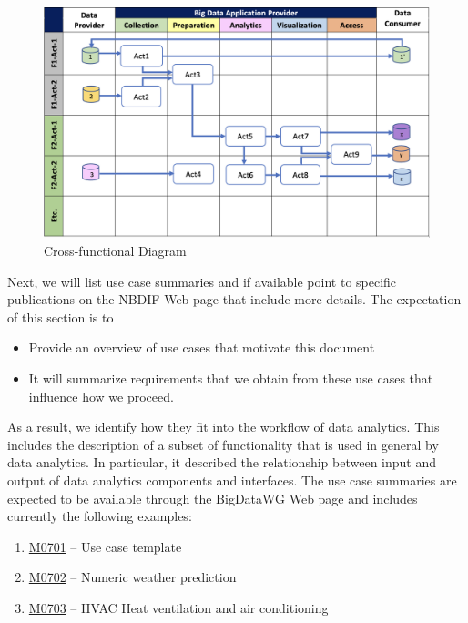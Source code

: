 \begin{figure}[htb]
    \centering
    \includegraphics[width=1.0\columnwidth]{images/cross-functional-diagram.png}
    \caption{Cross-functional Diagram}
    \label{fig:cross-functional-diagram}
\end{figure}


Next, we will list use case summaries and if available point to specific publications on the NBDIF Web page that include more details. The expectation of this section is to
 
\begin{itemize}
\item	Provide an overview of use cases that motivate this document
\item	It will summarize requirements that we obtain from these use cases that influence how we proceed.
\end{itemize}

As a result, we identify how they fit into the workflow of data analytics. This includes the description of a subset of functionality that is used in general by data analytics.  In particular, it described the relationship between input and output of data analytics components and interfaces.  The use case summaries are expected to be available through the BigDataWG Web page and includes currently the following examples:

\begin{enumerate}
\item	\href{https://bigdatawg.nist.gov/_uploadfiles/M0701_v1_2020102001.docx}{M0701} -- Use case template \cite{nist-usecase-template}
\item	\href{https://bigdatawg.nist.gov/_uploadfiles/M0702_v1_2020102002.pdf}{M0702} -- Numeric weather prediction \cite{nist-wrf}
\item	\href{https://bigdatawg.nist.gov/_uploadfiles/M0703_v1_2020102003.pdf}{M0703} -- HVAC Heat ventilation and air conditioning \cite{nist-hvac}
\end{enumerate}





